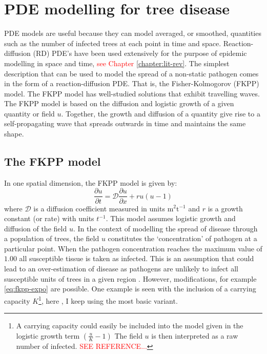 \section{PDE modelling for tree disease}
PDE models are useful because they can model averaged, or smoothed, quantities such as the number of infected trees at each point in time and space. Reaction-diffusion (RD) PDE's  have been used extensively for the purpose of epidemic modelling in space and time, \textcolor{red}{see Chapter \ref{chapter:lit-rev}}. The simplest description that can be used to model the spread of a non-static pathogen comes in the form of a reaction-diffusion PDE. That is, the Fisher-Kolmogorov (FKPP) model. The FKPP model has well-studied solutions that exhibit travelling waves. The FKPP model is based on the diffusion and logistic growth of a given quantity or field $u$. %
Together, the growth and diffusion of a quantity give rise to a self-propagating wave that spreads outwards in time and maintains the same shape.\\

\subsection{The FKPP model}

In one spatial dimension, the FKPP model is given by:
\begin{equation}
\label{eq:fkpp-expo}
    \frac{\partial u}{\partial t} = \mathcal{D}\frac{\partial u}{\partial x} + ru(u - 1)
\end{equation}
where $\mathcal{D}$ is a diffusion coefficient measured in units $\mathrm{m^2 t^{-1}}$ and $r$ is a growth constant (or rate) with units $t^{-1}$. %
This model assumes logistic growth and diffusion of the field $u$. In the context of modelling the spread of disease through a population of trees, the field $u$ constitutes the `concentration' of pathogen at a particular point. %
When the pathogen concentration reaches the maximum value of $1.00$ all susceptible tissue is taken as infected. This is an assumption that could lead to an over-estimation of disease  as pathogens are unlikely to infect all susceptible units of trees in a given region \cite{neher1992underestimation}. %
However,  modifications, for example \ref{eq:fkpp-expo} are possible. One example is seen with the inclusion of a carrying capacity $K$\footnote{A carrying capacity could easily be included into the model given in the logistic growth term $(\frac{u}{K} - 1)$ The field $u$ is then interpreted as a raw number of infected. \textcolor{red}{SEE REFERENCE...}}, here , I keep using   the most basic variant.

